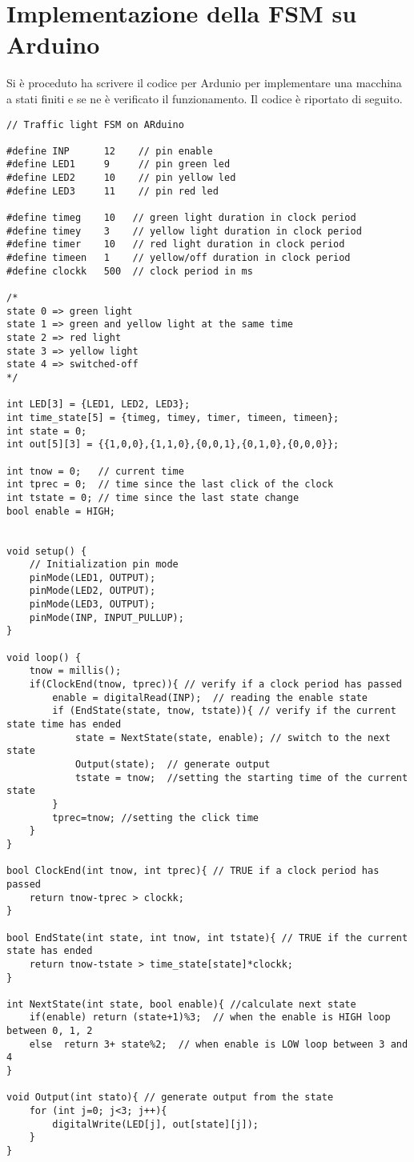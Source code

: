 \section{Implementazione della FSM su Arduino}

Si è proceduto ha scrivere il codice per Ardunio per implementare una macchina a stati finiti e se ne è verificato il funzionamento.
Il codice è riportato di seguito.

\begin{verbatim}
// Traffic light FSM on ARduino

#define INP      12    // pin enable
#define LED1     9     // pin green led  
#define LED2     10    // pin yellow led
#define LED3     11    // pin red led

#define timeg    10   // green light duration in clock period
#define timey    3    // yellow light duration in clock period
#define timer    10   // red light duration in clock period
#define timeen   1    // yellow/off duration in clock period
#define clockk   500  // clock period in ms

/*
state 0 => green light
state 1 => green and yellow light at the same time
state 2 => red light
state 3 => yellow light
state 4 => switched-off
*/

int LED[3] = {LED1, LED2, LED3};
int time_state[5] = {timeg, timey, timer, timeen, timeen};
int state = 0;
int out[5][3] = {{1,0,0},{1,1,0},{0,0,1},{0,1,0},{0,0,0}};

int tnow = 0;   // current time
int tprec = 0;  // time since the last click of the clock
int tstate = 0; // time since the last state change
bool enable = HIGH;


void setup() {
	// Initialization pin mode
	pinMode(LED1, OUTPUT);
	pinMode(LED2, OUTPUT);
	pinMode(LED3, OUTPUT);
	pinMode(INP, INPUT_PULLUP);
}

void loop() {
	tnow = millis();
	if(ClockEnd(tnow, tprec)){ // verify if a clock period has passed
		enable = digitalRead(INP);  // reading the enable state
		if (EndState(state, tnow, tstate)){ // verify if the current state time has ended
			state = NextState(state, enable); // switch to the next state
			Output(state);  // generate output
			tstate = tnow;  //setting the starting time of the current state
		}
		tprec=tnow; //setting the click time
	}
}

bool ClockEnd(int tnow, int tprec){ // TRUE if a clock period has passed
	return tnow-tprec > clockk;
}

bool EndState(int state, int tnow, int tstate){ // TRUE if the current state has ended
	return tnow-tstate > time_state[state]*clockk;
}

int NextState(int state, bool enable){ //calculate next state 
	if(enable) return (state+1)%3;  // when the enable is HIGH loop between 0, 1, 2
	else  return 3+ state%2;  // when enable is LOW loop between 3 and 4
}

void Output(int stato){ // generate output from the state
	for (int j=0; j<3; j++){
		digitalWrite(LED[j], out[state][j]);
	}
}	
\end{verbatim}